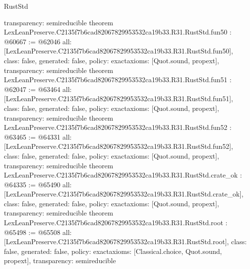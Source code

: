 \begin{lexlean}{RustStd}
\begin{coremodule}
{  transparency: semireducible
}
theorem LexLeanPreserve.C2135f7b6cad82067829953532ca19b33.R31.RustStd.fun50 : @60667 := @62046 {
  all: [LexLeanPreserve.C2135f7b6cad82067829953532ca19b33.R31.RustStd.fun50],
  class: false,
  generated: false,
  policy: exact{axioms: [Quot.sound, propext]},
  transparency: semireducible
}
theorem LexLeanPreserve.C2135f7b6cad82067829953532ca19b33.R31.RustStd.fun51 : @62047 := @63464 {
  all: [LexLeanPreserve.C2135f7b6cad82067829953532ca19b33.R31.RustStd.fun51],
  class: false,
  generated: false,
  policy: exact{axioms: [Quot.sound, propext]},
  transparency: semireducible
}
theorem LexLeanPreserve.C2135f7b6cad82067829953532ca19b33.R31.RustStd.fun52 : @63465 := @64331 {
  all: [LexLeanPreserve.C2135f7b6cad82067829953532ca19b33.R31.RustStd.fun52],
  class: false,
  generated: false,
  policy: exact{axioms: [Quot.sound, propext]},
  transparency: semireducible
}
theorem LexLeanPreserve.C2135f7b6cad82067829953532ca19b33.R31.RustStd.crate_ok : @64335 := @65490 {
  all: [LexLeanPreserve.C2135f7b6cad82067829953532ca19b33.R31.RustStd.crate_ok],
  class: false,
  generated: false,
  policy: exact{axioms: [Quot.sound, propext]},
  transparency: semireducible
}
theorem LexLeanPreserve.C2135f7b6cad82067829953532ca19b33.R31.RustStd.root : @65498 := @65508 {
  all: [LexLeanPreserve.C2135f7b6cad82067829953532ca19b33.R31.RustStd.root],
  class: false,
  generated: false,
  policy: exact{axioms: [Classical.choice, Quot.sound, propext]},
  transparency: semireducible
}


\end{coremodule}
\end{lexlean}

